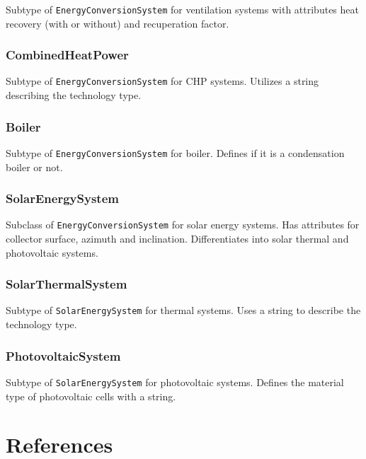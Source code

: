 \documentclass[a4paper,12pt]{article}
\let\stdsection\section%
\renewcommand\section{\newpage\stdsection}
\begin{document}
Subtype of \texttt{EnergyConversionSystem} for ventilation systems with
attributes heat recovery (with or without) and recuperation factor.

\subsubsection{CombinedHeatPower}\label{combinedheatpower}

Subtype of \texttt{EnergyConversionSystem} for CHP systems. Utilizes a
string describing the technology type.

\subsubsection{Boiler}\label{boiler}

Subtype of \texttt{EnergyConversionSystem} for boiler. Defines if it is
a condensation boiler or not.

\subsubsection{SolarEnergySystem}\label{solarenergysystem}

Subclass of \texttt{EnergyConversionSystem} for solar energy systems.
Has attributes for collector surface, azimuth and inclination.
Differentiates into solar thermal and photovoltaic systems.

\subsubsection{SolarThermalSystem}\label{solarthermalsystem}

Subtype of \texttt{SolarEnergySystem} for thermal systems. Uses a string
to describe the technology type.

\subsubsection{PhotovoltaicSystem}\label{photovoltaicsystem}

Subtype of \texttt{SolarEnergySystem} for photovoltaic systems. Defines
the material type of photovoltaic cells with a string.

\section*{References}\label{references}

\hypertarget{refs}{}
\end{document}
